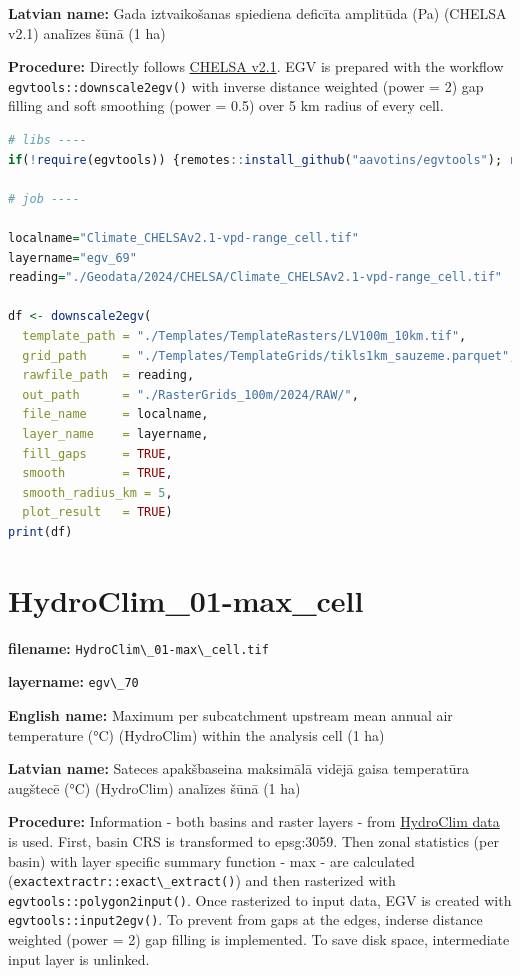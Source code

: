 \documentclass[
]{book}
\newcommand{\passthrough}[1]{#1}
\begin{document}
\textbf{Latvian name:} Gada iztvaikošanas spiediena deficīta amplitūda (Pa) (CHELSA v2.1) analīzes šūnā (1 ha)

\textbf{Procedure:} Directly follows \hyperref[Ch04.11]{CHELSA v2.1}. EGV is prepared with the
workflow \passthrough{\lstinline!egvtools::downscale2egv()!} with inverse distance weighted (power = 2)
gap filling and soft smoothing (power = 0.5) over 5 km radius of every cell.

\begin{lstlisting}[language=R]
# libs ----
if(!require(egvtools)) {remotes::install_github("aavotins/egvtools"); require(egvtools)}

# job ----

localname="Climate_CHELSAv2.1-vpd-range_cell.tif"
layername="egv_69"
reading="./Geodata/2024/CHELSA/Climate_CHELSAv2.1-vpd-range_cell.tif"

df <- downscale2egv(
  template_path = "./Templates/TemplateRasters/LV100m_10km.tif",
  grid_path     = "./Templates/TemplateGrids/tikls1km_sauzeme.parquet",
  rawfile_path  = reading,
  out_path      = "./RasterGrids_100m/2024/RAW/",
  file_name     = localname,
  layer_name    = layername,
  fill_gaps     = TRUE,
  smooth        = TRUE,
  smooth_radius_km = 5,
  plot_result   = TRUE)
print(df)
\end{lstlisting}

\section{HydroClim\_01-max\_cell}\label{ch06.070}

\textbf{filename:} \passthrough{\lstinline!HydroClim\_01-max\_cell.tif!}

\textbf{layername:} \passthrough{\lstinline!egv\_70!}

\textbf{English name:} Maximum per subcatchment upstream mean annual air temperature (°C) (HydroClim) within the analysis cell (1 ha)

\textbf{Latvian name:} Sateces apakšbaseina maksimālā vidējā gaisa temperatūra augštecē (°C) (HydroClim) analīzes šūnā (1 ha)

\textbf{Procedure:} Information - both basins and raster layers - from \hyperref[Ch04.12]{HydroClim data}
is used. First, basin CRS is transformed to epsg:3059. Then zonal statistics (per basin) with
layer specific summary function - max - are calculated (\passthrough{\lstinline!exactextractr::exact\_extract()!})
and then rasterized with \passthrough{\lstinline!egvtools::polygon2input()!}. Once rasterized to input data,
EGV is created with \passthrough{\lstinline!egvtools::input2egv()!}. To prevent from gaps at the edges,
inderse distance weighted (power = 2) gap filling is implemented. To save disk space,
intermediate input layer is unlinked.
\end{document}
